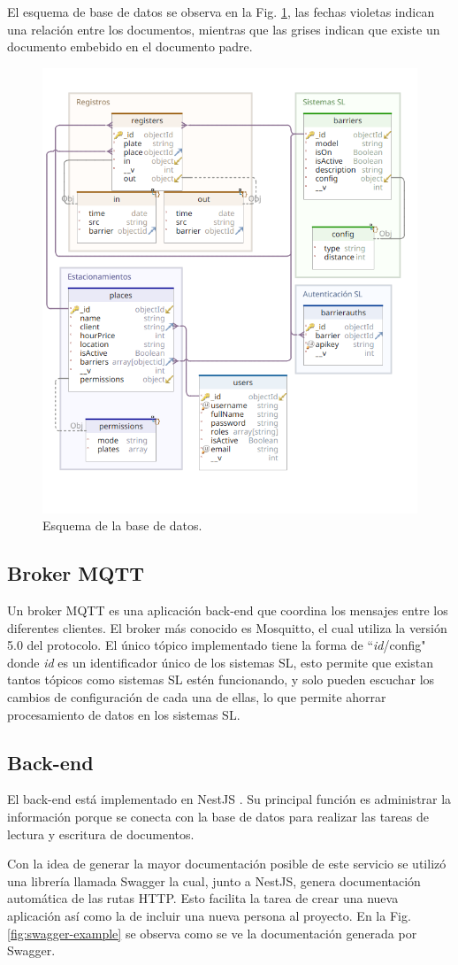 El esquema de base de datos se observa en la Fig. \ref{fig:db-uml}, las fechas violetas indican una relación entre los documentos, mientras que las grises indican que existe un documento embebido en el documento padre.

\begin{figure}[bth]
    \centering
    \includegraphics[width=.5\textwidth]{imgs/db.png}
    \caption{Esquema de la base de datos.}
    \label{fig:db-uml}
\end{figure}

\subsection{Broker MQTT}

Un broker MQTT es una aplicación back-end que coordina los mensajes entre los diferentes clientes.
El broker más conocido es Mosquitto, el cual utiliza la versión 5.0 del protocolo. El único tópico implementado tiene la forma de ``\textit{id}/config" donde \textit{id} es un identificador único de los sistemas SL, esto permite que existan tantos tópicos como sistemas SL estén funcionando, y solo pueden escuchar los cambios de configuración de cada una de ellas, lo que permite ahorrar procesamiento de datos en los sistemas SL.

\subsection{Back-end}

El back-end está implementado en NestJS \cite{noauthor_documentacion_nodate}. Su principal función es administrar la información porque se conecta con la base de datos para realizar las tareas de lectura y escritura de documentos.

Con la idea de generar la mayor documentación posible de este servicio se utilizó una librería llamada Swagger la cual, junto a NestJS, genera documentación automática de las rutas HTTP. Esto facilita la tarea de crear una nueva aplicación así como la de incluir una nueva persona al proyecto. En la Fig. \ref{fig:swagger-example} se observa como se ve la documentación generada por Swagger.

